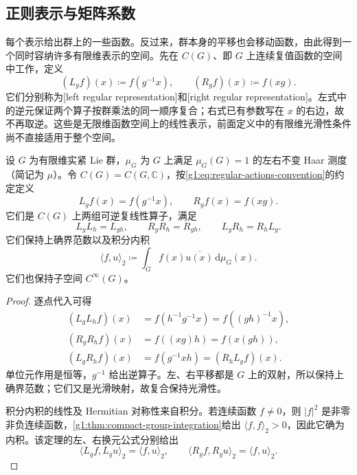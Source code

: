 \subsection{正则表示与矩阵系数}
\label{g1:subsec:2001:03}

每个表示给出群上的一些函数。反过来，群本身的平移也会移动函数，由此得到一个同时容纳许多有限维表示的空间。先在 \(C(G)\)、即 \(G\) 上连续复值函数的空间中工作，定义
\begin{equation}\label{g1:eq:regular-actions-convention}
	(L_gf)(x)\coloneqq f(g^{-1}x),\qquad
	(R_gf)(x)\coloneqq f(xg).
\end{equation}
它们分别称为[left regular representation]和[right regular representation]。左式中的逆元保证两个算子按群乘法的同一顺序复合；右式已有参数写在 \(x\) 的右边，故不再取逆。这些是无限维函数空间上的线性表示，前面定义中的有限维光滑性条件尚不直接适用于整个空间。

\begin{proposition}\label{g1:prop:regular-representations}
	设 \(G\) 为有限维实紧 Lie 群，\(\mu_G\) 为 \(G\) 上满足 \(\mu_G(G)=1\) 的左右不变 Haar 测度（简记为 \(\mu\)）。令 \(C(G)=C(G,\mathbb C)\)，按\eqref{g1:eq:regular-actions-convention}的约定定义
	\[
		L_gf(x)=f(g^{-1}x),\qquad R_gf(x)=f(xg).
	\]
	它们是 \(C(G)\) 上两组可逆复线性算子，满足
	\[
		L_gL_h=L_{gh},\qquad R_gR_h=R_{gh},\qquad L_gR_h=R_hL_g.
	\]
	它们保持上确界范数以及积分内积
	\begin{equation}\label{g1:eq:compact-group-function-inner-product}
		\langle f,u\rangle_2
		\coloneqq\int_G f(x)\overline{u(x)}\,\mathrm{d}\mu_G(x).
	\end{equation}
	它们也保持子空间 \(C^\infty(G)\)。
\end{proposition}
\begin{proof}
	逐点代入可得
	\[
		\begin{aligned}
			(L_gL_hf)(x)&=f(h^{-1}g^{-1}x)=f((gh)^{-1}x),\\
			(R_gR_hf)(x)&=f((xg)h)=f(x(gh)),\\
			(L_gR_hf)(x)&=f(g^{-1}xh)=(R_hL_gf)(x).
		\end{aligned}
	\]
	单位元作用是恒等，\(g^{-1}\) 给出逆算子。左、右平移都是 \(G\) 上的双射，所以保持上确界范数；它们又是光滑映射，故复合保持光滑性。

	积分内积的线性及 Hermitian 对称性来自积分。若连续函数 \(f\ne0\)，则 \(|f|^2\) 是非零非负连续函数，\cref{g1:thm:compact-group-integration}给出 \(\langle f,f\rangle_2>0\)，因此它确为内积。该定理的左、右换元公式分别给出
	\[
		\langle L_gf,L_gu\rangle_2=\langle f,u\rangle_2,
		\qquad
		\langle R_gf,R_gu\rangle_2=\langle f,u\rangle_2.
	\]
\end{proof}

